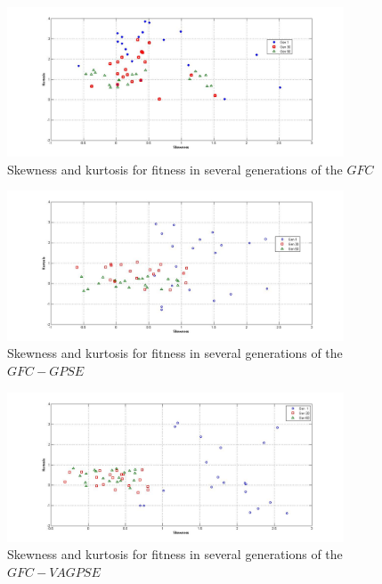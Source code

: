 \documentclass[10pt,journal,compsoc]{IEEEtran}
\begin{document}
\begin{figure}[!ht]	
	\begin{center}
		\includegraphics[width=10cm]{fig/gfc.jpg}
		\caption{Skewness and kurtosis for fitness in several generations
			of the  $GFC$}
		\label{fig:gfcsk}	
	\end{center}	
\end{figure}
\begin{figure}[!ht]	
	\begin{center}
		\includegraphics[width=10cm]{fig/gfcrse.jpg}
		\caption{Skewness and kurtosis for fitness in several generations
			of the  $GFC-GPSE$}
		\label{fig:gfcrsesk}	
	\end{center}	
\end{figure}
\begin{figure}[!ht]	
	\begin{center}
		\includegraphics[width=10cm]{fig/gfcvarse.jpg}
		\caption{Skewness and kurtosis for fitness in several generations
			of the  $GFC-VAGPSE$}
		\label{fig:gfcvarsesk}	
	\end{center}	
\end{figure}
\end{document}
